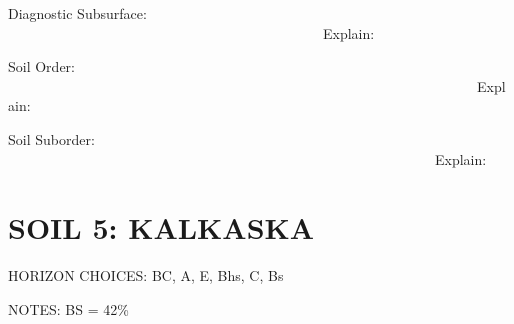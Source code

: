 \documentclass[
  letterpaper,
  twocolumn,
  portrait]{scrbook}
\begin{document}
Diagnostic Subsurface:
~~~~~~~~~~~~~~~~~~~~~~~~~~~~~~~~~~~~~~~~~~~~~Explain:

Soil Order:
~~~~~~~~~~~~~~~~~~~~~~~~~~~~~~~~~~~~~~~~~~~~~~~~~~~~~~~~~~~~~~~~~~~Explain:

Soil Suborder:
~~~~~~~~~~~~~~~~~~~~~~~~~~~~~~~~~~~~~~~~~~~~~~~~~~~~~~~~~~~~~Explain:

\hypertarget{soil-5-kalkaska}{%
\section{SOIL 5: KALKASKA}\label{soil-5-kalkaska}}

HORIZON CHOICES: BC, A, E, Bhs, C, Bs

NOTES: BS = 42\%

 
  \providecommand{\huxb}[2]{\arrayrulecolor[RGB]{#1}\global\arrayrulewidth=#2pt}
  \providecommand{\huxvb}[2]{\color[RGB]{#1}\vrule width #2pt}
  \providecommand{\huxtpad}[1]{\rule{0pt}{#1}}
  \providecommand{\huxbpad}[1]{\rule[-#1]{0pt}{#1}}
\end{document}
